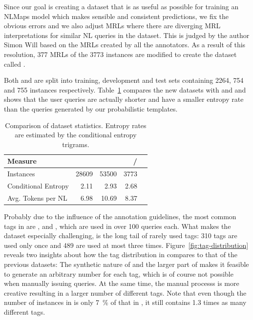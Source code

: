 Since our goal is creating a dataset that is as useful as possible for training
an NLMaps model which makes sensible and consistent predictions, we fix the
obvious errors and we also adjust MRLs where there are diverging MRL
interpretations for similar NL queries in the dataset. This is judged by the
author Simon Will based on the MRLs created by all the annotators. As a result
of this resolution, \num{377} MRLs of the \num{3773} instances are modified to
create the dataset called \nlmapsfour{}.

Both \nlmfourraw{} and \nlmfour{} are split into training, development and test
sets containing \num{2264}, \num{754} and \num{755} instances respectively.
Table~\ref{tab:v2-v3-v4-overview} compares the new datasets with \nlmtwoone{}
and \nlmthreeb{} and shows that the user queries are actually shorter and have a
smaller entropy rate than the queries generated by our probabilistic templates.

\begin{table}[h]
  \centering
  \begin{tabular}{lrrrr}
    \toprule
    Measure & \nlmtwoone{} & \nlmthreeb{} & \nlmfourraw{}/\nlmfour{}\\
    \midrule
    Instances & \num{28609} & \num{53500} & \num{3773}\\
    Conditional Entropy & \num{2.11} & \num{2.93} & \num{2.68}\\
    Avg. Tokens per NL & \num{6.98} & \num{10.69} & \num{8.37}\\
    \bottomrule
  \end{tabular}
  \caption[Dataset statistics with \nlmapsfour{}]{Comparison of dataset
    statistics. Entropy rates are estimated by the conditional entropy
    trigrams.}
  \label{tab:v2-v3-v4-overview}
\end{table}

Probably due to the influence of the annotation guidelines, the most common tags
in \nlmapsfour{} are ,  and
, which are used in over \num{100} queries each. What makes
the dataset especially challenging, is the long tail of rarely used tags:
\num{310} tags are used only once and \num{489} are used at most three times.
Figure~\ref{fig:tag-distribution} reveals two insights about how the tag
distribution in \nlmapsfour{} compares to that of the previous datasets: The
synthetic nature of \nlmapsthreeb{} and the larger part of \nlmapstwoone{} makes
it feasible to generate an arbitrary number for each tag, which is of course not
possible when manually issuing queries. At the same time, the manual processs is
more creative resulting in a larger number of different tags. Note that even
though the number of instances in \nlmapsfour{} is only \SI{7}{\%} of that in
\nlmapsthree{}, it still contains \num{1.3} times as many different tags.

